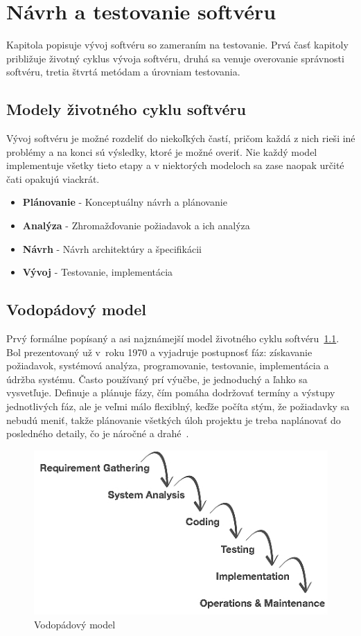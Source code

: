 \chapter{Návrh a testovanie softvéru}
\label{tests_design}
Kapitola popisuje vývoj softvéru so zameraním na testovanie. 
Prvá časť kapitoly približuje životný cyklus vývoja softvéru, druhá sa venuje overovanie správnosti softvéru, tretia štvrtá metódam a úrovniam testovania.

\section{Modely životného cyklu softvéru}
\label{life_cycles}
Vývoj softvéru je možné rozdeliť do niekoľkých častí, pričom každá z nich rieši iné problémy a na konci sú výsledky, ktoré je možné overiť.
Nie každý model implementuje všetky tieto etapy a v niektorých modeloch sa zase naopak určité čati opakujú viackrát.
\begin{itemize}
	\item \textbf{Plánovanie} - Konceptuálny návrh a plánovanie
	\item \textbf{Analýza} - Zhromažďovanie požiadavok a ich analýza
	\item \textbf{Návrh} - Návrh architektúry a špecifikácii
	\item \textbf{Vývoj} - Testovanie, implementácia
\end{itemize}

\section*{Vodopádový model}
\label{waterfall_model}
Prvý formálne popísaný a asi najznámejší model životného cyklu softvéru~\ref{waterfall_model_fig}.
Bol prezentovaný už v~roku 1970 a vyjadruje postupnosť fáz: získavanie požiadavok, systémová analýza, programovanie, testovanie, implementácia a údržba systému.
Často používaný prí výučbe, je jednoduchý a ľahko sa vysvetľuje.
Definuje a plánuje fázy, čím pomáha dodržovať termíny a výstupy jednotlivých fáz, ale je veľmi málo flexiblný, keďže počíta stým, že požiadavky sa nebudú meniť, takže plánovanie všetkých úloh projektu je treba naplánovať do posledného detaily, čo je náročné a drahé~\cite{Patton}.
\begin{figure}[H]
\centering
\includegraphics[width=0.65\linewidth]{obrazky/waterfall_model.png}
\caption{Vodopádový model~\cite{models}}
\label{waterfall_model_fig}
\end{figure}

